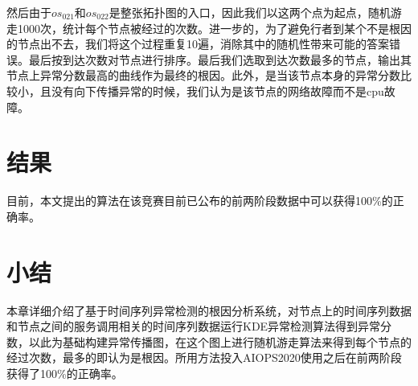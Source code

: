 然后由于$os_{021}$和$os_{022}$是整张拓扑图的入口，因此我们以这两个点为起点，随机游走1000次，统计每个节点被经过的次数。进一步的，为了避免行者到某个不是根因的节点出不去，我们将这个过程重复10遍，消除其中的随机性带来可能的答案错误。最后按到达次数对节点进行排序。最后我们选取到达次数最多的节点，输出其节点上异常分数最高的曲线作为最终的根因。此外，是当该节点本身的异常分数比较小，且没有向下传播异常的时候，我们认为是该节点的网络故障而不是cpu故障。

\section{结果}
目前，本文提出的算法在该竞赛目前已公布的前两阶段数据中可以获得100\%的正确率。

\section{小结}
本章详细介绍了基于时间序列异常检测的根因分析系统，对节点上的时间序列数据和节点之间的服务调用相关的时间序列数据运行KDE异常检测算法得到异常分数，以此为基础构建异常传播图，在这个图上进行随机游走算法来得到每个节点的经过次数，最多的即认为是根因。所用方法投入AIOPS2020使用之后在前两阶段获得了100\%的正确率。